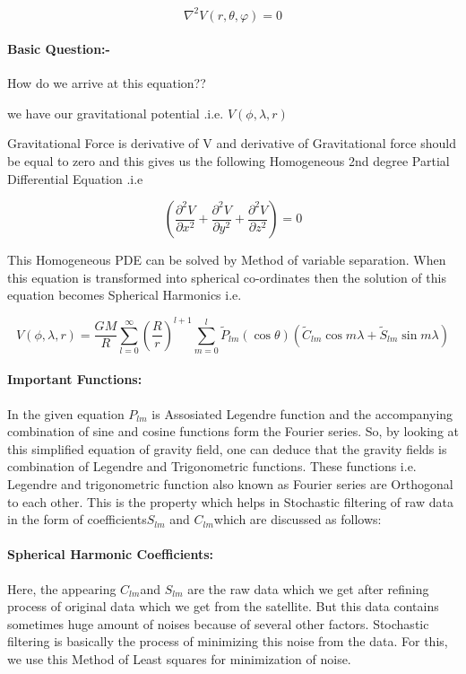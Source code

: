 \documentclass[a4paper,12pt]{article}
\begin{document}
\begin {equation}
\nabla ^2V(r,\theta ,\varphi) = 0
\end{equation}

\paragraph{Basic Question:-} How do we arrive at this equation??

we have our gravitational potential .i.e. $V(\phi,\lambda,r)$

Gravitational Force is derivative of V and derivative of Gravitational force should be equal to zero and this gives us the following Homogeneous 2nd degree Partial Differential Equation .i.e

   \[ \left( \frac{\partial^2 V}{\partial x^2}
      + \frac{\partial^2 V}{\partial y^2}
      + \frac{\partial^2 V}{\partial z^2} \right)=0 \]

This Homogeneous PDE  can be solved by Method of variable separation. When this equation is transformed into spherical co-ordinates then the solution of this equation becomes Spherical Harmonics i.e.

\begin{equation}
V(\phi,\lambda,r)=\frac{GM}{R}\sum_{l=0}^{\infty} \left(\frac{R}{r}\right)^{l+1}\sum_{m=0}^{l} \widetilde{P}_{lm}(\cos\theta)(\widetilde{C}_{lm}\cos m\lambda + \widetilde{S}_{lm}\sin m\lambda)
\end{equation}

\paragraph{Important Functions:} 
In the given equation $P_{lm}$ is Assosiated Legendre function and the accompanying combination of sine and cosine functions form the Fourier series. So, by looking at this simplified equation of gravity field, one can deduce that the gravity fields is combination of Legendre and Trigonometric functions.
These functions i.e. Legendre and trigonometric function also known as Fourier series are Orthogonal to each other. This is the property which helps in Stochastic filtering of raw data in the form of coefficients$ S_{lm}$ and $C_{lm} $which are discussed as follows:  
\paragraph{Spherical Harmonic Coefficients:} 
Here, the appearing $C_{lm}$and $S_{lm}$ are the raw data which we get after refining process of original data which we get from the satellite. But this data contains sometimes huge amount of noises because of several other factors. Stochastic filtering is basically the process of minimizing this noise from the data. For this, we use this Method of Least squares for minimization of noise.
\end{document}
